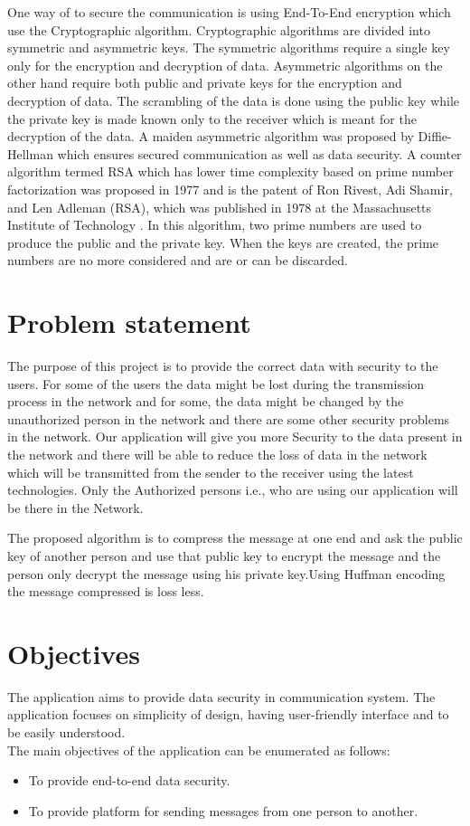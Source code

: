 One way of to secure the communication is using End-To-End encryption which use the Cryptographic algorithm. Cryptographic algorithms are divided
into symmetric and asymmetric keys. The symmetric algorithms require a single key only for the
encryption and decryption of data. Asymmetric algorithms on the other hand require both public
and private keys for the encryption and decryption of data. The scrambling of the data is done
using the public key while the private key is made known only to the receiver which is meant for
the decryption of the data.
A maiden asymmetric algorithm was proposed by Diffie-Hellman  which ensures secured
communication as well as data security. A counter algorithm termed RSA which has lower time
complexity based on prime number factorization was proposed in 1977 and is the patent of Ron
Rivest, Adi Shamir, and Len Adleman (RSA), which was published in 1978 at the Massachusetts
Institute of Technology . In this algorithm, two prime numbers are used to produce the public
and the private key. When the keys are created, the prime numbers are no more considered and
are or can be discarded.\cite{sa}

\pagebreak
\section{Problem statement}
\vspace{-18pt}
The purpose of this project is to provide the correct data with security to the users. For
some of the users the data might be lost during the transmission process in the network
and for some, the data might be changed by the unauthorized person in the network and
there are some other security problems in the network. Our application will give you more
Security to the data present in the network and there will be able to reduce the loss of data
in the network which will be transmitted from the sender to the receiver using the latest
technologies. Only the Authorized persons i.e., who are using our application will be
there in the Network.

The proposed algorithm is to compress the message at one end and ask the public key of another person and use that public key to encrypt the message and the person only decrypt the message using his private key.Using Huffman encoding the message compressed is loss less.


\section{Objectives}
The application aims to provide data security in communication system. The application focuses on
simplicity of design, having user-friendly interface and to be easily understood. \\
The main objectives of the application can be enumerated as follows:
\vspace{-18pt}
\begin{itemize}
	\item To provide end-to-end data security.
	\item To provide platform for sending messages from one person to another.
\end{itemize}

